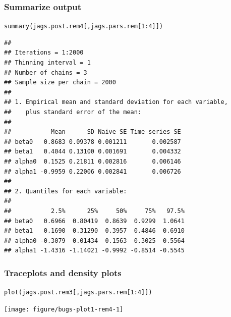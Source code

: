 \documentclass[color=usenames,dvipsnames]{beamer}\usepackage[]{graphicx}\usepackage[]{color}
\makeatletter
\newcommand{\hlnum}[1]{\textcolor[rgb]{0.69,0.494,0}{#1}}%
\newcommand{\hlopt}[1]{\textcolor[rgb]{0,0,0}{#1}}%
\newcommand{\hlstd}[1]{\textcolor[rgb]{0,0,0}{#1}}%
\newcommand{\hlkwd}[1]{\textcolor[rgb]{0.004,0.004,0.506}{#1}}%
\newenvironment{kframe}{%
 \def\at@end@of@kframe{}%
 \ifinner\ifhmode%
  \def\at@end@of@kframe{\end{minipage}}%
  \begin{minipage}{\columnwidth}%
 \fi\fi%
 \def\FrameCommand##1{\hskip\@totalleftmargin \hskip-\fboxsep
 \colorbox{shadecolor}{##1}\hskip-\fboxsep
     \hskip-\linewidth \hskip-\@totalleftmargin \hskip\columnwidth}%
 \MakeFramed {\advance\hsize-\width
   \@totalleftmargin\z@ \linewidth\hsize
   \@setminipage}}%
 {\par\unskip\endMakeFramed%
 \at@end@of@kframe}
\newenvironment{knitrout}{}{} %
\makeatother
\begin{document}
\begin{frame}[fragile]
  \frametitle{Summarize output}
\begin{knitrout}\tiny
{}\color{fgcolor}\begin{kframe}
\begin{alltt}
\hlkwd{summary}\hlstd{(jags.post.rem4[,jags.pars.rem[}\hlnum{1}\hlopt{:}\hlnum{4}\hlstd{]])}
\end{alltt}
\begin{verbatim}
## 
## Iterations = 1:2000
## Thinning interval = 1 
## Number of chains = 3 
## Sample size per chain = 2000 
## 
## 1. Empirical mean and standard deviation for each variable,
##    plus standard error of the mean:
## 
##           Mean      SD Naive SE Time-series SE
## beta0   0.8683 0.09378 0.001211       0.002587
## beta1   0.4044 0.13100 0.001691       0.004332
## alpha0  0.1525 0.21811 0.002816       0.006146
## alpha1 -0.9959 0.22006 0.002841       0.006726
## 
## 2. Quantiles for each variable:
## 
##           2.5%      25%     50%     75%   97.5%
## beta0   0.6966  0.80419  0.8639  0.9299  1.0641
## beta1   0.1690  0.31290  0.3957  0.4846  0.6910
## alpha0 -0.3079  0.01434  0.1563  0.3025  0.5564
## alpha1 -1.4316 -1.14021 -0.9992 -0.8514 -0.5545
\end{verbatim}
\end{kframe}
\end{knitrout}
\end{frame}




\begin{frame}[fragile]
  \frametitle{Traceplots and density plots}
\begin{knitrout}\footnotesize
{}\color{fgcolor}\begin{kframe}
\begin{alltt}
\hlkwd{plot}\hlstd{(jags.post.rem3[,jags.pars.rem[}\hlnum{1}\hlopt{:}\hlnum{4}\hlstd{]])}
\end{alltt}
\end{kframe}

{\centering \texttt{[image: figure/bugs-plot1-rem4-1]} 

}



\end{knitrout}
\end{frame}
\end{document}
